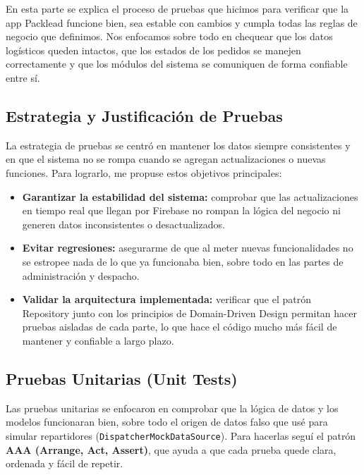 En esta parte se explica el proceso de pruebas que hicimos para verificar que la app Packlead funcione bien, sea estable con cambios y cumpla todas las reglas de negocio que definimos. Nos enfocamos sobre todo en chequear que los datos logísticos queden intactos, que los estados de los pedidos se manejen correctamente y que los módulos del sistema se comuniquen de forma confiable entre sí.

\subsection{Estrategia y Justificación de Pruebas}
La estrategia de pruebas se centró en mantener los datos siempre consistentes y en que el sistema no se rompa cuando se agregan actualizaciones o nuevas funciones. Para lograrlo, me propuse estos objetivos principales:

\begin{itemize}
    \item \textbf{Garantizar la estabilidad del sistema:} comprobar que las actualizaciones en tiempo real que llegan por Firebase no rompan la lógica del negocio ni generen datos inconsistentes o desactualizados.
    \item \textbf{Evitar regresiones:} asegurarme de que al meter nuevas funcionalidades no se estropee nada de lo que ya funcionaba bien, sobre todo en las partes de administración y despacho.
    \item \textbf{Validar la arquitectura implementada:} verificar que el patrón Repository junto con los principios de Domain-Driven Design permitan hacer pruebas aisladas de cada parte, lo que hace el código mucho más fácil de mantener y confiable a largo plazo.
\end{itemize}

\subsection{Pruebas Unitarias (Unit Tests)}
Las pruebas unitarias se enfocaron en comprobar que la lógica de datos y los modelos funcionaran bien, sobre todo el origen de datos falso que usé para simular repartidores (\texttt{DispatcherMockDataSource}). Para hacerlas seguí el patrón \textbf{AAA (Arrange, Act, Assert)}, que ayuda a que cada prueba quede clara, ordenada y fácil de repetir.

